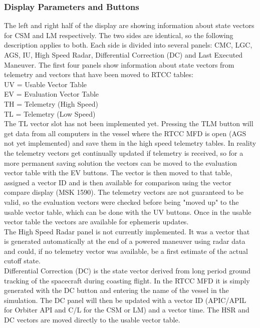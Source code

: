 \documentclass[11pt]{article} %
\begin{document}
\subsubsection{Display Parameters and Buttons}

The left and right half of the display are showing information about state vectors for CSM and LM respectively. The two sides are identical, so the following description applies to both. Each side is divided into several panels: CMC, LGC, AGS, IU, High Speed Radar, Differential Correction (DC) and Last Executed Maneuver. The first four panels show information about state vectors from telemetry and vectors that have been moved to RTCC tables:\\

UV = Usable Vector Table\\
EV = Evaluation Vector Table\\
TH = Telemetry (High Speed)\\
TL = Telemetry (Low Speed)\\

The TL vector slot has not been implemented yet. Pressing the TLM button will get data from all computers in the vessel where the RTCC MFD is open (AGS not yet implemented) and save them in the high speed telemetry tables. In reality the telemetry vectors get continually updated if telemetry is received, so for a more permanent saving solution the vectors can be moved to the evaluation vector table with the EV buttons. The vector is then moved to that table, assigned a vector ID and is then available for comparison using the vector compare display (MSK 1590). The telemetry vectors are not guaranteed to be valid, so the evaluation vectors were checked before being "moved up" to the usable vector table, which can be done with the UV buttons. Once in the usable vector table the vectors are available for ephemeris updates.\\

The High Speed Radar panel is not currently implemented. It was a vector that is generated automatically at the end of a powered maneuver using radar data and could, if no telemetry vector was available, be a first estimate of the actual cutoff state.\\

Differential Correction (DC) is the state vector derived from long period ground tracking of the spacecraft during coasting flight. In the RTCC MFD it is simply generated with the DC button and entering the name of the vessel in the simulation. The DC panel will then be updated with a vector ID (APIC/APIL for Orbiter API and C/L for the CSM or LM) and a vector time. The HSR and DC vectors are moved directly to the usable vector table.\\
\end{document}
